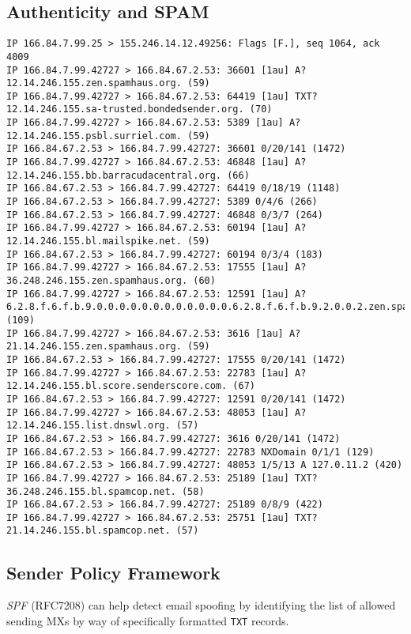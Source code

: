\documentclass[xga]{xdvislides}
\begin{document}
\subsection{Authenticity and SPAM}
\smallish
\begin{verbatim}
IP 166.84.7.99.25 > 155.246.14.12.49256: Flags [F.], seq 1064, ack 4009
IP 166.84.7.99.42727 > 166.84.67.2.53: 36601 [1au] A? 12.14.246.155.zen.spamhaus.org. (59)
IP 166.84.7.99.42727 > 166.84.67.2.53: 64419 [1au] TXT? 12.14.246.155.sa-trusted.bondedsender.org. (70)
IP 166.84.7.99.42727 > 166.84.67.2.53: 5389 [1au] A? 12.14.246.155.psbl.surriel.com. (59)
IP 166.84.67.2.53 > 166.84.7.99.42727: 36601 0/20/141 (1472)
IP 166.84.7.99.42727 > 166.84.67.2.53: 46848 [1au] A? 12.14.246.155.bb.barracudacentral.org. (66)
IP 166.84.67.2.53 > 166.84.7.99.42727: 64419 0/18/19 (1148)
IP 166.84.67.2.53 > 166.84.7.99.42727: 5389 0/4/6 (266)
IP 166.84.67.2.53 > 166.84.7.99.42727: 46848 0/3/7 (264)
IP 166.84.7.99.42727 > 166.84.67.2.53: 60194 [1au] A? 12.14.246.155.bl.mailspike.net. (59)
IP 166.84.67.2.53 > 166.84.7.99.42727: 60194 0/3/4 (183)
IP 166.84.7.99.42727 > 166.84.67.2.53: 17555 [1au] A? 36.248.246.155.zen.spamhaus.org. (60)
IP 166.84.7.99.42727 > 166.84.67.2.53: 12591 [1au] A? 6.2.8.f.6.f.b.9.0.0.0.0.0.0.0.0.0.0.0.0.6.2.8.f.6.f.b.9.2.0.0.2.zen.spamhaus.org. (109)
IP 166.84.7.99.42727 > 166.84.67.2.53: 3616 [1au] A? 21.14.246.155.zen.spamhaus.org. (59)
IP 166.84.67.2.53 > 166.84.7.99.42727: 17555 0/20/141 (1472)
IP 166.84.7.99.42727 > 166.84.67.2.53: 22783 [1au] A? 12.14.246.155.bl.score.senderscore.com. (67)
IP 166.84.67.2.53 > 166.84.7.99.42727: 12591 0/20/141 (1472)
IP 166.84.7.99.42727 > 166.84.67.2.53: 48053 [1au] A? 12.14.246.155.list.dnswl.org. (57)
IP 166.84.67.2.53 > 166.84.7.99.42727: 3616 0/20/141 (1472)
IP 166.84.67.2.53 > 166.84.7.99.42727: 22783 NXDomain 0/1/1 (129)
IP 166.84.67.2.53 > 166.84.7.99.42727: 48053 1/5/13 A 127.0.11.2 (420)
IP 166.84.7.99.42727 > 166.84.67.2.53: 25189 [1au] TXT? 36.248.246.155.bl.spamcop.net. (58)
IP 166.84.67.2.53 > 166.84.7.99.42727: 25189 0/8/9 (422)
IP 166.84.7.99.42727 > 166.84.67.2.53: 25751 [1au] TXT? 21.14.246.155.bl.spamcop.net. (57)
\end{verbatim}
\Normalsize

\subsection{Sender Policy Framework}
{\em SPF} (RFC7208) can help detect email spoofing by identifying the
list of allowed sending MXs by way of specifically
formatted {\tt TXT} records. \\
\end{document}
